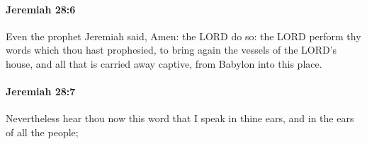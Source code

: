 		\paragraph{Jeremiah 28:6} %
			\label{JEREMIAH-28-6}

			Even the prophet Jeremiah said, Amen: the LORD do so: the LORD perform thy words which thou hast prophesied, to bring again the vessels of the LORD’s house, and all that is carried away captive, from Babylon into this place.


		\paragraph{Jeremiah 28:7} %
			\label{JEREMIAH-28-7}

			Nevertheless hear thou now this word that I speak in thine ears, and in the ears of all the people;


